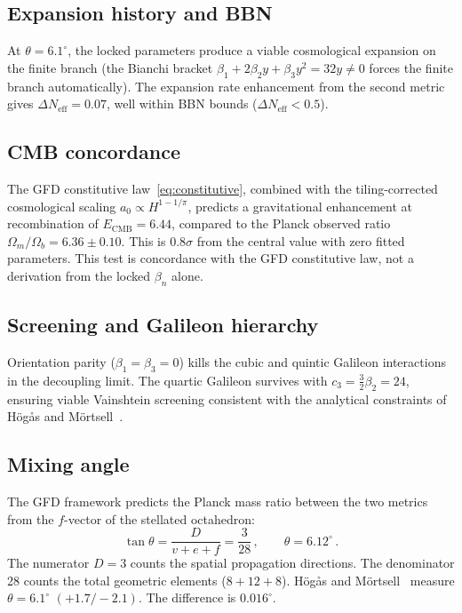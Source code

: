 \documentclass[twocolumn,showpacs,preprintnumbers,amsmath,amssymb,prd]{revtex4-2}
\begin{document}
\subsection{Expansion history and BBN}

At $\theta = 6.1^\circ$, the locked parameters produce a viable cosmological expansion on the finite branch (the Bianchi bracket $\beta_1 + 2\beta_2 y + \beta_3 y^2 = 32y \neq 0$ forces the finite branch automatically). The expansion rate enhancement from the second metric gives $\Delta N_\mathrm{eff} = 0.07$, well within BBN bounds ($\Delta N_\mathrm{eff} < 0.5$).

\subsection{CMB concordance}

The GFD constitutive law~\eqref{eq:constitutive}, combined with the tiling-corrected cosmological scaling $a_0 \propto H^{1-1/\pi}$, predicts a gravitational enhancement at recombination of $E_\mathrm{CMB} = 6.44$, compared to the Planck observed ratio $\Omega_m/\Omega_b = 6.36 \pm 0.10$. This is $0.8\sigma$ from the central value with zero fitted parameters. This test is concordance with the GFD constitutive law, not a derivation from the locked $\beta_n$ alone.

\subsection{Screening and Galileon hierarchy}

Orientation parity ($\beta_1 = \beta_3 = 0$) kills the cubic and quintic Galileon interactions in the decoupling limit. The quartic Galileon survives with $c_3 = \tfrac{3}{2}\beta_2 = 24$, ensuring viable Vainshtein screening consistent with the analytical constraints of H\"og\aa s and M\"ortsell~\cite{HogasMortsell2021a}.

\subsection{Mixing angle}

The GFD framework predicts the Planck mass ratio between the two metrics from the $f$-vector of the stellated octahedron:
\begin{equation}
\tan\theta = \frac{D}{v + e + f} = \frac{3}{28}\,,\qquad \theta = 6.12^\circ\,.
\end{equation}
The numerator $D = 3$ counts the spatial propagation directions. The denominator 28 counts the total geometric elements ($8 + 12 + 8$). H\"og\aa s and M\"ortsell~\cite{HogasMortsell2025} measure $\theta = 6.1^\circ$ $(+1.7/-2.1)$. The difference is $0.016^\circ$.
\end{document}

